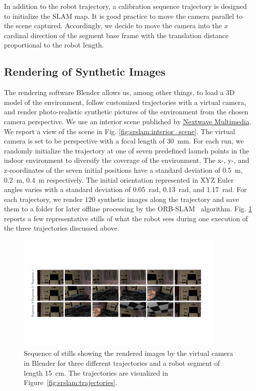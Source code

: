 In addition to the robot trajectory, a calibration sequence trajectory is designed to initialize the \gls{SLAM} map. 
It is good practice to move the camera parallel to the scene captured. Accordingly, we decide to move the camera into the $x$ cardinal direction of the segment base frame with the translation distance proportional to the robot length.

\subsection{Rendering of Synthetic Images}
The rendering software Blender allows us, among other things, to load a 3D model of the environment, follow customized trajectories with a virtual camera, and render photo-realistic synthetic pictures of the environment from the chosen camera perspective. We use an interior scene published by \href{https://www.nextwavemultimedia.com/html/3dblendermodel.html}{Nextwave Multimedia}. We report a view of the scene in Fig. \ref{fig:srslam:interior_scene}.
The virtual camera is set to be perspective with a focal length of \SI{30}{mm}.
For each run, we randomly initialize the trajectory at one of seven predefined launch points in the indoor environment to diversify the coverage of the environment.
The x-, y-, and z-coordinates of the seven initial positions have a standard deviation of \SI{0.5}{m}, \SI{0.2}{m}, \SI{0.4}{m} respectively. The initial orientation represented in XYZ Euler angles varies with a standard deviation of \SI{0.05}{rad}, \SI{0.13}{rad}, and \SI{1.17}{rad}.
For each trajectory, we render $120$ synthetic images along the trajectory and save them to a folder for later offline processing by the ORB-SLAM~\citep{mur2017orb} algorithm. Fig. \ref{fig:srslam:sequences_of_stills_simulations_cropped} reports a few representative stills of what the robot sees during one execution of the three trajectories discussed above.

\begin{figure}
    \centering
    \includegraphics[width=0.9\textwidth]{srslam/figures/graphic_sequences_of_stills_simulations_compressed.pdf}
    \caption{Sequence of stills showing the rendered images by the virtual camera in Blender for three different trajectories and a robot segment of length \SI{15}{cm}. The trajectories are visualized in Figure~\ref{fig:srslam:trajectories}.}
    \label{fig:srslam:sequences_of_stills_simulations_cropped}
\end{figure}

